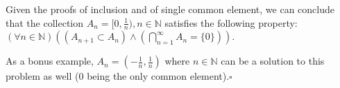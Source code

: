 \documentclass[12pt,letter]{memoir}
\begin{document}
Given the proofs of inclusion and of single common element, we can conclude that the collection $A_n=[0, \frac{1}{n}), n \in \mathbb{N}$ satisfies the following property: $(\forall n \in \mathbb{N})((A_{n+1} \subset A_n) \land (\bigcap\limits_{n=1}^{\infty}A_n=\{0\}))$.

As a bonus example, $A_n=(-\frac{1}{n}, \frac{1}{n})$ where $n \in \mathbb{N}$ can be a solution to this problem as well (0 being the only common element).$\square$ 

\appendix
\backmatter
\glsaddall
\end{document}
